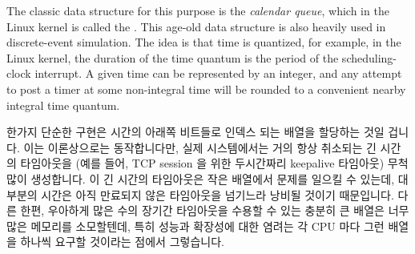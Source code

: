 The classic data structure for this purpose is the \emph{calendar queue},
which in the Linux kernel is called the .
This age-old data structure is also heavily used in discrete-event
simulation.
The idea is that time is quantized, for example, in the Linux kernel,
the duration of the time quantum is the period of the scheduling-clock
interrupt.
A given time can be represented by an integer, and any attempt to post
a timer at some non-integral time will be rounded to a convenient nearby
integral time quantum.

\fi

한가지 단순한 구현은 시간의 아래쪽 비트들로 인덱스 되는 배열을 할당하는 것일
겁니다.
이는 이론상으로는 동작합니다만, 실제 시스템에서는 거의 항상 취소되는 긴 시간의
타임아웃을 (예를 들어, TCP session 을 위한 두시간짜리 keepalive 타임아웃) 무척
많이 생성합니다.
이 긴 시간의 타임아웃은 작은 배열에서 문제를 일으킬 수 있는데, 대부분의 시간은
아직 만료되지 않은 타임아웃을 넘기느라 낭비될 것이기 때문입니다.
다른 한편, 우아하게 많은 수의 장기간 타임아웃을 수용할 수 있는 충분히 큰 배열은
너무 많은 메모리를 소모할텐데, 특히 성능과 확장성에 대한 염려는 각 CPU 마다
그런 배열을 하나씩 요구할 것이라는 점에서 그렇습니다.

